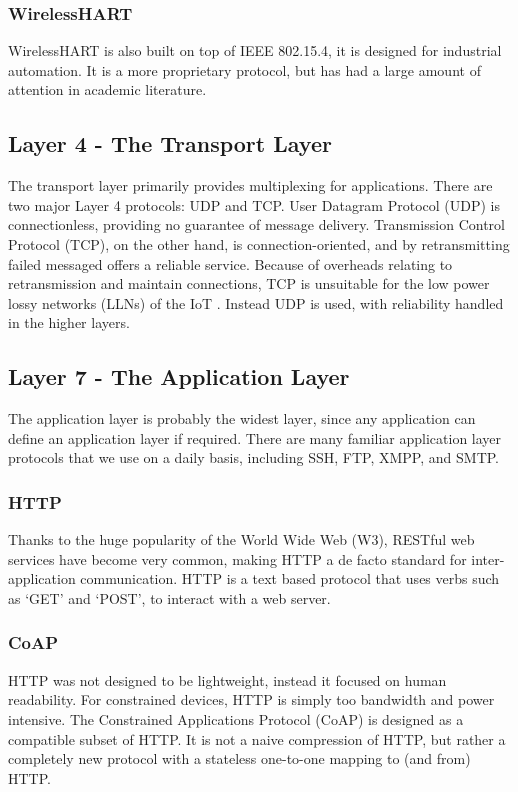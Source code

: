 \documentclass[10pt,journal,compsoc]{IEEEtran}
\begin{document}
\subsubsection{WirelessHART}
WirelessHART is also built on top of IEEE 802.15.4, it is designed for
industrial automation. It is a more proprietary protocol, but has had a large
amount of attention in academic literature.  

\subsection{Layer 4 - The Transport Layer}
The transport layer primarily provides multiplexing for applications. There are
two major Layer 4 protocols:  UDP and TCP. User Datagram Protocol (UDP) is
connectionless, providing no guarantee of message delivery.  Transmission
Control Protocol (TCP), on the other hand, is connection-oriented, and by
retransmitting failed messaged offers a reliable service. Because of overheads
relating to retransmission and maintain connections, TCP is unsuitable for the
low power lossy networks (LLNs) of the IoT \cite{embedded}. Instead UDP is
used, with reliability handled in the higher layers.

\subsection{Layer 7 - The Application Layer}
The application layer is probably the widest layer, since any application can
define an application layer if required. There are many familiar
application layer protocols that we use on a daily basis, including SSH,
FTP, XMPP, and SMTP. 

\subsubsection{HTTP} 
Thanks to the huge popularity of the World Wide Web (W3), RESTful web services
have become very common, making HTTP a de facto standard for inter-application
communication. HTTP is a text based protocol that uses verbs such as `GET' and
`POST', to interact with a web server.  

\subsubsection{CoAP}
HTTP was not designed to be lightweight, instead it focused on human
readability. For constrained devices, HTTP is simply too bandwidth and power
intensive. The Constrained Applications Protocol (CoAP) is designed as a
compatible subset of HTTP. It is not a naive compression of HTTP, but rather a
completely new protocol with a stateless one-to-one mapping to (and from) HTTP. 
\end{document}
